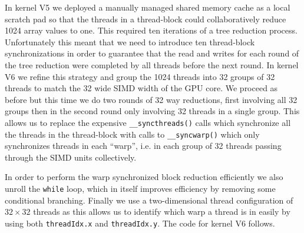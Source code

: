 In kernel V5 we deployed a manually managed shared memory cache as a local scratch pad so that the threads in a thread-block could collaboratively reduce 1024 array values to one. This required ten iterations of a tree reduction process. Unfortunately this meant that we need to introduce ten thread-block synchronizations in order to guarantee that the read and writes for each round of the tree reduction were completed by all threads before the next round. In kernel V6 we refine this strategy and group the 1024 threads into 32 groups of 32 threads to match the 32 wide SIMD width of the GPU core. We proceed as before but this time we do two rounds of 32 way reductions, first involving all 32 groups then in the second round only involving 32 threads in a single group. This allows us to replace the expensive \texttt{\_\_syncthreads()} calls which synchronize all the threads in the thread-block with calls to \texttt{\_\_syncwarp()} which only synchronizes threads in each ``warp'', i.e. in each group of 32 threads passing through the SIMD units collectively. 

In order to perform the warp synchronized block reduction efficiently we also unroll the \texttt{while} loop, which in itself improves efficiency by removing some conditional branching. Finally we use a two-dimensional thread configuration of $32\times 32$ threads as this allows us to identify which warp a thread is in easily by using both \texttt{threadIdx.x} and \texttt{threadIdx.y}. The code for kernel V6 follows.

